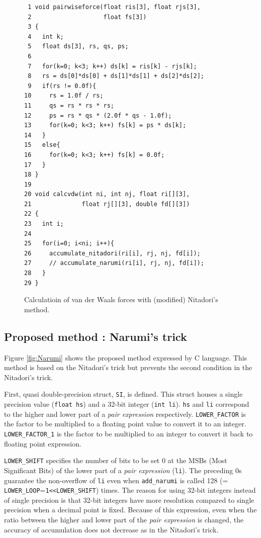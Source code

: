 \begin{figure}
\begin{center}\footnotesize
\begin{minipage}{100mm}\def\baselinestretch{0.8}
\begin{verbatim}
 1 void pairwiseforce(float ris[3], float rjs[3], 
 2                    float fs[3])
 3 {
 4   int k;
 5   float ds[3], rs, qs, ps;
 6 
 7   for(k=0; k<3; k++) ds[k] = ris[k] - rjs[k];
 8   rs = ds[0]*ds[0] + ds[1]*ds[1] + ds[2]*ds[2];
 9   if(rs != 0.0f){
10     rs = 1.0f / rs;
11     qs = rs * rs * rs;
12     ps = rs * qs * (2.0f * qs - 1.0f);
13     for(k=0; k<3; k++) fs[k] = ps * ds[k];
14   }
15   else{
16     for(k=0; k<3; k++) fs[k] = 0.0f;
17   }
18 }
19 
20 void calcvdw(int ni, int nj, float ri[][3], 
21              float rj[][3], double fd[][3])
22 {
23   int i;
24 
25   for(i=0; i<ni; i++){
26     accumulate_nitadori(ri[i], rj, nj, fd[i]);
27     // accumulate_narumi(ri[i], rj, nj, fd[i]);
28   }
29 }
\end{verbatim}\def\baselinestretch{1.0}
\end{minipage}
\caption{Calculatioin of van der Waals forces with
(modified) Nitadori's method.}
\label{fig:calcvdw}
\end{center}
\end{figure}

\subsection{Proposed method : Narumi's trick}

Figure \ref{fig:Narumi} shows the proposed method expressed by C language.
This method is based on the Nitadori's trick but 
prevents the second condition in the Nitadori's trick.

First, quasi double-precision struct, {\tt SI}, is defined. This struct houses
a single precision value ({\tt float hs}) and a 32-bit integer ({\tt int li}).
{\tt hs} and {\tt li} correspond to the higher and lower part of a {\it pair
expression} respectively.
{\tt LOWER\_FACTOR} is the factor to be multiplied to a floating point
value to convert it to an integer.
{\tt LOWER\_FACTOR\_1} is the factor to be multiplied to an integer
to convert it back to floating point expression.

{\tt LOWER\_SHIFT} specifies the number of bits to be set 0 at
the MSBs (Most Significant Bits) of the lower part of a {\it pair
expression} ({\tt li}). The preceding 0s guarantee the non-overflow of
{\tt li} even when {\tt add\_narumi} is called 128 (={\tt
  LOWER\_LOOP}={\tt 1<<LOWER\_SHIFT}) times. The reason for
using 32-bit integers instead of single precision is that 32-bit
integers have more resolution compared to single precision when a
decimal point is fixed. Because of this expression, even when the
ratio between the higher and lower part of the {\it pair expression} is
changed, the accuracy of accumulation does not decrease as in the
Nitadori's trick.

